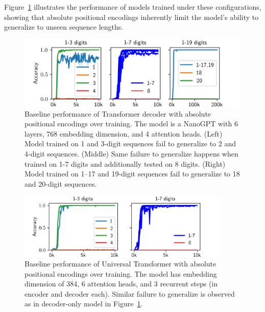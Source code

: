 Figure~\ref{fig:baseline_and_longer} illustrates the performance of models trained under these configurations, showing that absolute positional encodings inherently limit the model's ability to generalize to unseen sequence lengths.

\begin{figure}[h!]
    \centering
    \includegraphics[width=\textwidth]{fig/baseline_and_longer.png}
    \caption{Baseline performance of Transformer decoder with absolute positional encodings over training. The model is a NanoGPT with 6 layers, 768 embedding dimension, and 4 attention heads. (Left) Model trained on 1 and 3-digit sequences fail to generalize to 2 and 4-digit sequences. (Middle) Same failure to generalize happens when trained on 1-7 digits and additionally tested on 8 digits. (Right) Model trained on 1--17 and 19-digit sequences fail to generalize to 18 and 20-digit sequences.}
    \label{fig:baseline_and_longer}
\end{figure}

\begin{figure}[h!]
    \centering
    \includegraphics[width=0.9\textwidth]{fig/baseline_and_longer_ut.png}
    \caption{Baseline performance of Universal Transformer with absolute positional encodings over training. The model has embedding dimension of 384, 6 attention heads, and 3 recurrent steps (in encoder and decoder each). Similar failure to generalize is observed as in decoder-only model in Figure~\ref{fig:baseline_and_longer}.}
    \label{fig:baseline_and_longer_ut}
\end{figure}

